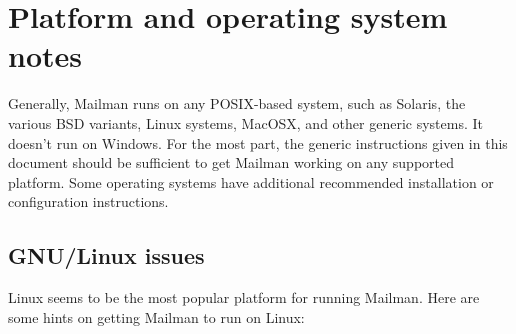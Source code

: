 \documentclass{howto}
\begin{document}
\section{Platform and operating system notes}

Generally, Mailman runs on any POSIX-based system, such as Solaris, the
various BSD variants, Linux systems, MacOSX, and other generic \UNIX{}
systems.  It doesn't run on Windows.  For the most part, the generic
instructions given in this document should be sufficient to get Mailman
working on any supported platform.  Some operating systems have additional
recommended installation or configuration instructions.

\subsection{GNU/Linux issues}

Linux seems to be the most popular platform for running Mailman.  Here are
some hints on getting Mailman to run on Linux:
\end{document}
